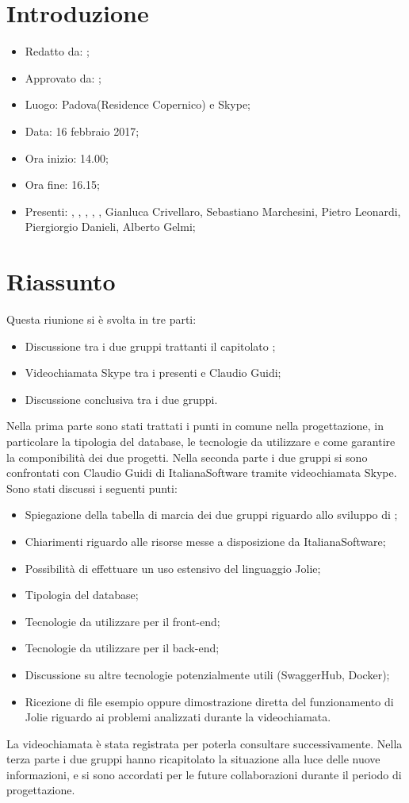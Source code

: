 \section{Introduzione}

	\begin{itemize}
		\item Redatto da: \MC;
		\item Approvato da: \AS;
		\item Luogo: Padova(Residence Copernico) e Skype;
		\item Data: 16 febbraio 2017;
		\item Ora inizio: 14.00;
		\item Ora fine: 16.15;
		\item Presenti: \AN, \DAN, \DS, \MC, \NS, Gianluca Crivellaro, Sebastiano Marchesini, Pietro Leonardi, Piergiorgio Danieli, Alberto Gelmi;	
	\end{itemize}

\section{Riassunto}
Questa riunione si è svolta in tre parti:
\begin{itemize}
	\item Discussione tra i due gruppi trattanti il capitolato \progetto;
	\item Videochiamata Skype tra i presenti e Claudio Guidi;
	\item Discussione conclusiva tra i due gruppi.
\end{itemize}
Nella prima parte sono stati trattati i punti in comune nella progettazione, in particolare la tipologia del database, le tecnologie da utilizzare e come garantire la componibilità dei due progetti.
Nella seconda parte i due gruppi si sono confrontati con Claudio Guidi di ItalianaSoftware tramite videochiamata Skype. Sono stati discussi i seguenti punti:
\begin{itemize}
	\item Spiegazione della tabella di marcia dei due gruppi riguardo allo sviluppo di \progetto;
	\item Chiarimenti riguardo alle risorse messe a disposizione da ItalianaSoftware;
	\item Possibilità di effettuare un uso estensivo del linguaggio Jolie;
	\item Tipologia del database;
	\item Tecnologie da utilizzare per il front-end;
	\item Tecnologie da utilizzare per il back-end;
	\item Discussione su altre tecnologie potenzialmente utili (SwaggerHub, Docker);
	\item Ricezione di file esempio oppure dimostrazione diretta del funzionamento di Jolie riguardo ai problemi analizzati durante la videochiamata.
\end{itemize}
La videochiamata è stata registrata per poterla consultare successivamente.
Nella terza parte i due gruppi hanno ricapitolato la situazione alla luce delle nuove informazioni, e si sono accordati per le future collaborazioni durante il periodo di progettazione.